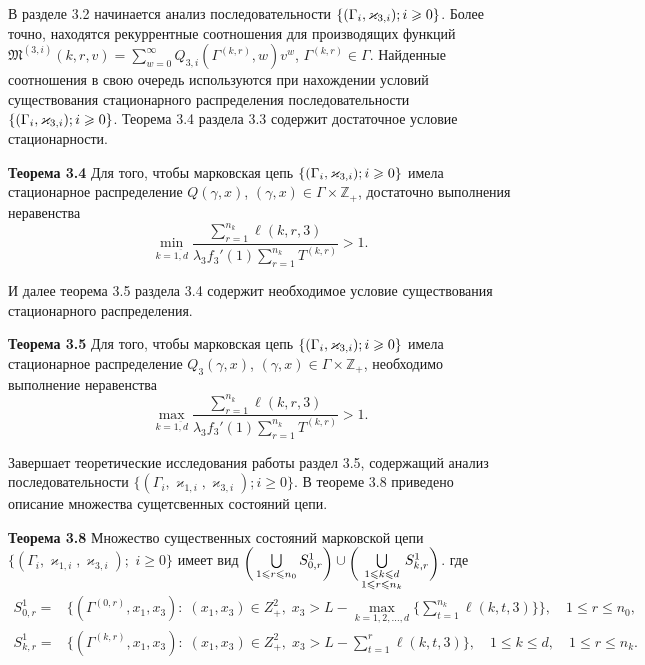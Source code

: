 \documentclass[14pt]{extarticle}
\theoremstyle{theorem}
\theoremstyle{remark}
\renewcommand*{\hm}[1]{#1\nobreak\discretionary{}%
	{\hbox{$\mathsurround=0pt #1$}}{}}%
\newcommand{\MarkThree}{\{(\Gamma_i, \varkappa_{3,i}); \hm{} i \geqslant 0\}}
\begin{document}
В разделе 3.2 начинается анализ последовательности $\MarkThree$. Более точно, находятся рекуррентные соотношения для производящих функций $
\mathfrak{M}^{(3,i)}(k,r,v) = \sum_{w=0}^{\infty} Q_{3,i}(\Gamma^{(k,r)},w) v^w
$, $\Gamma^{(k,r)}\in \Gamma$. 
Найденные соотношения в свою очередь используются при нахождении условий существования стационарного распределения последовательности $\MarkThree$. Теорема 3.4 раздела 3.3 содержит достаточное условие стационарности.

 {\bf Теорема 3.4}
{ 
Для того, чтобы марковская цепь $\MarkThree$ имела стационарное распределение $Q(\gamma,x)$, $(\gamma,x)\in \Gamma \times {\mathbb Z}_+$, достаточно выполнения неравенства 
\begin{equation*}
\min_{k=\overline{1,d}} { \frac{\sum_{r = 1}^{n_k} \ell(k,r,3) }{\lambda_3 f_3'(1) \sum_{r=1}^{n_k} T^{(k,r)} }}>1.
\label{sufficient:low}
\end{equation*}
}

И далее теорема 3.5 раздела 3.4 содержит необходимое условие существования стационарного распределения.

 {\bf Теорема 3.5}
{
Для того, чтобы марковская цепь $\MarkThree$ имела стационарное распределение $Q_3(\gamma,x)$, $(\gamma,x)\in \Gamma \times {\mathbb Z}_+$, необходимо выполнение неравенства
$$
\max_{k=\overline{1,d}} { \frac{\sum_{r = 1}^{n_{k}}\ell(k,r,3)}{\lambda_3 f_3'(1) \sum_{r = 1}^{n_k} T^{(k,r)}} } >1.
$$
}

Завершает теоретические исследования работы раздел 3.5, содержащий анализ последовательности $\{(\Gamma_i, \varkappa_{1,i},\varkappa_{3,i}); i \geqslant 0\}$. В теореме 3.8 приведено описание множества сущетсвенных состояний цепи.


{\bf Теорема 3.8}
Множество существенных состояний марковской цепи $\{(\Gamma_i, \varkappa_{1,i},\varkappa_{3,i});$ $i \geqslant 0\}$ имеет вид $\raisebox{-.5ex}{$\biggl($}\bigcup\limits_{1 \leqslant r \leqslant n_0}S^1_{0,r}\raisebox{-.5ex}{$\biggr)$}\cup \raisebox{-.5ex}{$\biggl($}\bigcup\limits_{\substack{1 \leqslant k \leqslant d\\ 1 \leqslant r \leqslant n_k}} S^1_{k,r}\raisebox{-.5ex}{$\biggr)$}$.
где
\begin{align*}
  S^1_{0,r} = & 
  \biggl\{
  (\Gamma^{(0,r)},x_1, x_3) \colon \; (x_1, x_3)\in Z^2_+,\; x_3 > L - \max\limits_{k=1, 2,
    \ldots, d}
  \biggl\{ \sum_{t=1}^{n_k} \ell({k,t,3}) \biggl\}\biggl\}, 
  \quad 1 \leqslant r \leqslant n_0, \\
  S^1_{k,r} = & 
  \biggl\{
  (\Gamma^{(k,r)},x_1, x_3) \colon \; (x_1, x_3)\in Z^2_+,\; x_3 > L - \sum_{t=1}^{r} \ell({k,t,3})
  \biggr\}, 
  \quad 1 \leqslant k \leqslant d, \quad 1 \leqslant r \leqslant n_k.
\end{align*}
\end{document}
